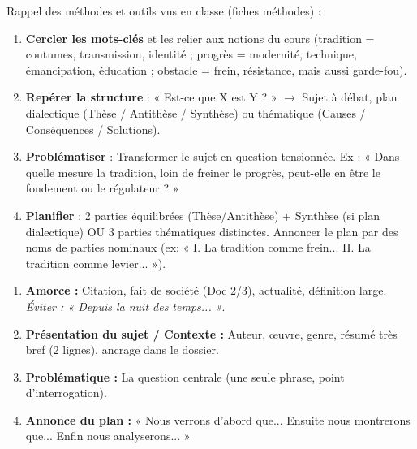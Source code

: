 \documentclass[11pt]{article}
\newcounter{popsec}
\newcounter{popsub}
\newcommand{\courssub}[1]{%
  \stepcounter{popsub}%
  \par\vspace{9pt}\noindent{\popxbold\fontsize{11.5}{13}\selectfont\color{popink}{\color{poporange}\thepopsec.\thepopsub}\hspace{6pt}#1}\par\nopagebreak\vspace{4pt}
}
\begin{document}
\courssub{Ressources à mobiliser}
\noindent Rappel des méthodes et outils vus en classe (fiches méthodes) :

\begin{methode}
\begin{enumerate}
    \item \textbf{Cercler les mots-clés} et les relier aux notions du cours (tradition = coutumes, transmission, identité ; progrès = modernité, technique, émancipation, éducation ; obstacle = frein, résistance, mais aussi garde-fou).
    \item \textbf{Repérer la structure} : « Est-ce que X est Y ? » $\rightarrow$ Sujet à débat, plan dialectique (Thèse / Antithèse / Synthèse) ou thématique (Causes / Conséquences / Solutions).
    \item \textbf{Problématiser} : Transformer le sujet en question tensionnée. Ex : « Dans quelle mesure la tradition, loin de freiner le progrès, peut-elle en être le fondement ou le régulateur ? »
    \item \textbf{Planifier} : 2 parties équilibrées (Thèse/Antithèse) + Synthèse (si plan dialectique) OU 3 parties thématiques distinctes. Annoncer le plan par des noms de parties nominaux (ex: « I. La tradition comme frein... II. La tradition comme levier... »).
\end{enumerate}
\end{methode}

\begin{methode}
\begin{enumerate}
    \item \textbf{Amorce :} Citation, fait de société (Doc 2/3), actualité, définition large. \textit{Éviter : « Depuis la nuit des temps... »}.
    \item \textbf{Présentation du sujet / Contexte :} Auteur, œuvre, genre, résumé très bref (2 lignes), ancrage dans le dossier.
    \item \textbf{Problématique :} La question centrale (une seule phrase, point d'interrogation).
    \item \textbf{Annonce du plan :} « Nous verrons d'abord que... Ensuite nous montrerons que... Enfin nous analyserons... »
\end{enumerate}
\end{methode}
\end{document}
